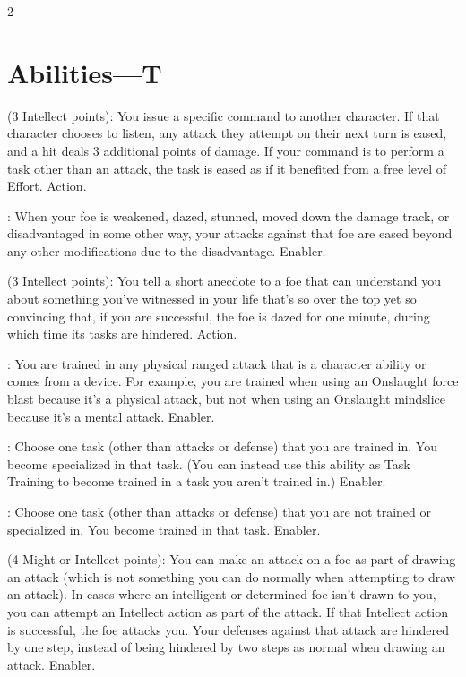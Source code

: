 \begin{multicols}{2}

\section{Abilities—T}

 (3 Intellect points): You issue a specific command to another character. If that character chooses to listen, any attack they attempt on their next turn is eased, and a hit deals 3 additional points of damage. If your command is to perform a task other than an attack, the task is eased as if it benefited from a free level of Effort. Action.
 
: When your foe is weakened, dazed, stunned, moved down the damage track, or disadvantaged in some other way, your attacks against that foe are eased beyond any other modifications due to the disadvantage. Enabler. 
 
 (3 Intellect points): You tell a short anecdote to a foe that can understand you about something you’ve witnessed in your life that’s so over the top yet so convincing that, if you are successful, the foe is dazed for one minute, during which time its tasks are hindered. Action. 
 
: You are trained in any physical ranged attack that is a character ability or comes from a device. For example, you are trained when using an Onslaught force blast because it’s a physical attack, but not when using an Onslaught mindslice because it’s a mental attack. Enabler. 
 
: Choose one task (other than attacks or defense) that you are trained in. You become specialized in that task. (You can instead use this ability as Task Training to become trained in a task you aren’t trained in.) Enabler. 
 
: Choose one task (other than attacks or defense) that you are not trained or specialized in. You become trained in that task. Enabler. 
 
 (4 Might or Intellect points): You can make an attack on a foe as part of drawing an attack (which is not something you can do normally when attempting to draw an attack). In cases where an intelligent or determined foe isn’t drawn to you, you can attempt an Intellect action as part of the attack. If that Intellect action is successful, the foe attacks you. Your defenses against that attack are hindered by one step, instead of being hindered by two steps as normal when drawing an attack. Enabler. 
 

\end{multicols}
